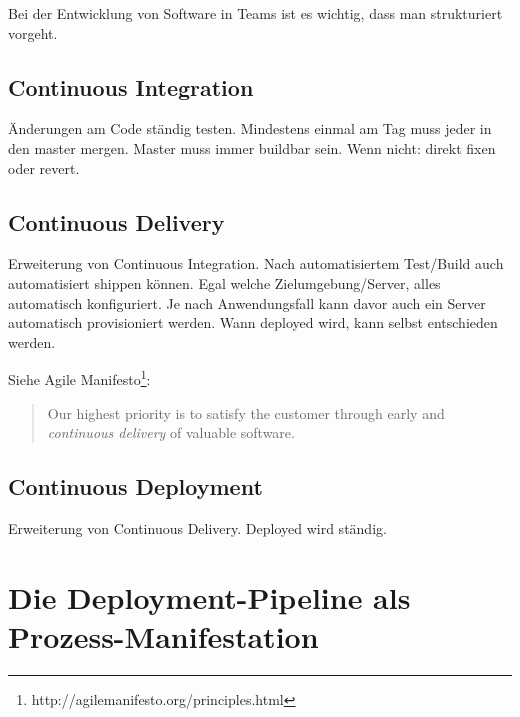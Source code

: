 \begin{draft}
Bei der Entwicklung von Software in Teams ist es wichtig, dass man strukturiert vorgeht.

\subsection{Continuous Integration}

Änderungen am Code ständig testen. Mindestens einmal am Tag muss jeder in den master mergen. Master muss immer buildbar sein. Wenn nicht: direkt fixen oder revert.

\subsection{Continuous Delivery}

Erweiterung von Continuous Integration. Nach automatisiertem Test/Build auch automatisiert shippen können. Egal welche Zielumgebung/Server, alles automatisch konfiguriert. Je nach Anwendungsfall kann davor auch ein Server automatisch provisioniert werden. Wann deployed wird, kann selbst entschieden werden.

Siehe Agile Manifesto\footnote{http://agilemanifesto.org/principles.html}:

\begin{quote}
  Our highest priority is to satisfy the customer through early and \emph{continuous delivery} of valuable software.
\end{quote}


\subsection{Continuous Deployment}

Erweiterung von Continuous Delivery. Deployed wird ständig.


\section{Die Deployment-Pipeline als Prozess-Manifestation} \label{sec02:deployment-pipeline}
\end{draft}
